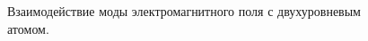 \begin{figure}
\centering



\caption{Взаимодействие моды электромагнитного поля с двухуровневым атомом.}
\label{figPart1Ch2_1}
\end{figure}
